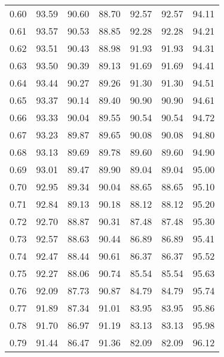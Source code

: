 \begin{tabular}{|c|c|c|c|c|c|c|}
      0.60 &     93.59 &     90.60 &      88.70 &   92.57 &      92.57 &         94.11 \\
      0.61 &     93.57 &     90.53 &      88.85 &   92.28 &      92.28 &         94.21 \\
      0.62 &     93.51 &     90.43 &      88.98 &   91.93 &      91.93 &         94.31 \\
      0.63 &     93.50 &     90.39 &      89.13 &   91.69 &      91.69 &         94.41 \\
      0.64 &     93.44 &     90.27 &      89.26 &   91.30 &      91.30 &         94.51 \\
      0.65 &     93.37 &     90.14 &      89.40 &   90.90 &      90.90 &         94.61 \\
      0.66 &     93.33 &     90.04 &      89.55 &   90.54 &      90.54 &         94.72 \\
      0.67 &     93.23 &     89.87 &      89.65 &   90.08 &      90.08 &         94.80 \\
      0.68 &     93.13 &     89.69 &      89.78 &   89.60 &      89.60 &         94.90 \\
      0.69 &     93.01 &     89.47 &      89.90 &   89.04 &      89.04 &         95.00 \\
      0.70 &     92.95 &     89.34 &      90.04 &   88.65 &      88.65 &         95.10 \\
      0.71 &     92.84 &     89.13 &      90.18 &   88.12 &      88.12 &         95.20 \\
      0.72 &     92.70 &     88.87 &      90.31 &   87.48 &      87.48 &         95.30 \\
      0.73 &     92.57 &     88.63 &      90.44 &   86.89 &      86.89 &         95.41 \\
      0.74 &     92.47 &     88.44 &      90.61 &   86.37 &      86.37 &         95.52 \\
      0.75 &     92.27 &     88.06 &      90.74 &   85.54 &      85.54 &         95.63 \\
      0.76 &     92.09 &     87.73 &      90.87 &   84.79 &      84.79 &         95.74 \\
      0.77 &     91.89 &     87.34 &      91.01 &   83.95 &      83.95 &         95.86 \\
      0.78 &     91.70 &     86.97 &      91.19 &   83.13 &      83.13 &         95.98 \\
      0.79 &     91.44 &     86.47 &      91.36 &   82.09 &      82.09 &         96.12 \\

\end{tabular}

